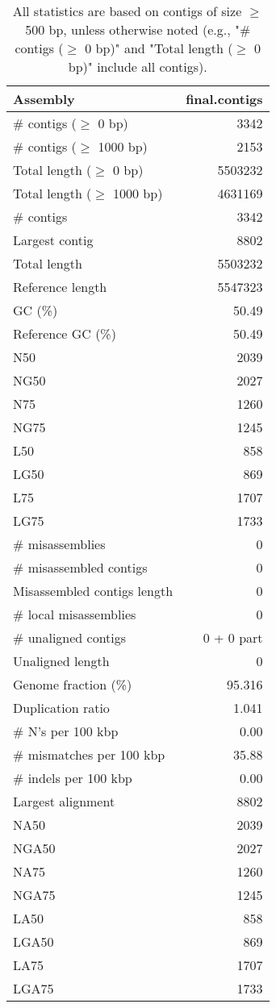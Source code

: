 \documentclass[12pt,a4paper]{article}
\begin{document}
\begin{table}[ht]
\begin{center}
\caption{All statistics are based on contigs of size $\geq$ 500 bp, unless otherwise noted (e.g., "\# contigs ($\geq$ 0 bp)" and "Total length ($\geq$ 0 bp)" include all contigs).}
\begin{tabular}{|l*{1}{|r}|}
\hline
Assembly & final.contigs \\ \hline
\# contigs ($\geq$ 0 bp) & 3342 \\ \hline
\# contigs ($\geq$ 1000 bp) & 2153 \\ \hline
Total length ($\geq$ 0 bp) & 5503232 \\ \hline
Total length ($\geq$ 1000 bp) & 4631169 \\ \hline
\# contigs & 3342 \\ \hline
Largest contig & 8802 \\ \hline
Total length & 5503232 \\ \hline
Reference length & 5547323 \\ \hline
GC (\%) & 50.49 \\ \hline
Reference GC (\%) & 50.49 \\ \hline
N50 & 2039 \\ \hline
NG50 & 2027 \\ \hline
N75 & 1260 \\ \hline
NG75 & 1245 \\ \hline
L50 & 858 \\ \hline
LG50 & 869 \\ \hline
L75 & 1707 \\ \hline
LG75 & 1733 \\ \hline
\# misassemblies & 0 \\ \hline
\# misassembled contigs & 0 \\ \hline
Misassembled contigs length & 0 \\ \hline
\# local misassemblies & 0 \\ \hline
\# unaligned contigs & 0 + 0 part \\ \hline
Unaligned length & 0 \\ \hline
Genome fraction (\%) & 95.316 \\ \hline
Duplication ratio & 1.041 \\ \hline
\# N's per 100 kbp & 0.00 \\ \hline
\# mismatches per 100 kbp & 35.88 \\ \hline
\# indels per 100 kbp & 0.00 \\ \hline
Largest alignment & 8802 \\ \hline
NA50 & 2039 \\ \hline
NGA50 & 2027 \\ \hline
NA75 & 1260 \\ \hline
NGA75 & 1245 \\ \hline
LA50 & 858 \\ \hline
LGA50 & 869 \\ \hline
LA75 & 1707 \\ \hline
LGA75 & 1733 \\ \hline
\end{tabular}
\end{center}
\end{table}
\end{document}
